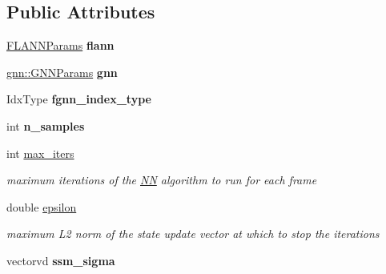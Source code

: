 \subsection*{Public Attributes}
\begin{DoxyCompactItemize}
\item 
\hypertarget{structmtf_1_1NNParams_aba503f4e6671f3c21ee9f25215bbb5e3}{\hyperlink{structmtf_1_1FLANNParams}{F\-L\-A\-N\-N\-Params} {\bfseries flann}}\label{structmtf_1_1NNParams_aba503f4e6671f3c21ee9f25215bbb5e3}

\item 
\hypertarget{structmtf_1_1NNParams_aa31237cc9d8a6d825af01c606c8c4606}{\hyperlink{structgnn_1_1GNNParams}{gnn\-::\-G\-N\-N\-Params} {\bfseries gnn}}\label{structmtf_1_1NNParams_aa31237cc9d8a6d825af01c606c8c4606}

\item 
\hypertarget{structmtf_1_1NNParams_adf7994496e9d3a8204bd6b8059605432}{Idx\-Type {\bfseries fgnn\-\_\-index\-\_\-type}}\label{structmtf_1_1NNParams_adf7994496e9d3a8204bd6b8059605432}

\item 
\hypertarget{structmtf_1_1NNParams_af3b03c0976fa1a8219391f7ddd988c42}{int {\bfseries n\-\_\-samples}}\label{structmtf_1_1NNParams_af3b03c0976fa1a8219391f7ddd988c42}

\item 
\hypertarget{structmtf_1_1NNParams_aa975a023178ef9da04c0ef89eedf745b}{int \hyperlink{structmtf_1_1NNParams_aa975a023178ef9da04c0ef89eedf745b}{max\-\_\-iters}}\label{structmtf_1_1NNParams_aa975a023178ef9da04c0ef89eedf745b}

\begin{DoxyCompactList}\small\item\em maximum iterations of the \hyperlink{classNN}{N\-N} algorithm to run for each frame \end{DoxyCompactList}\item 
\hypertarget{structmtf_1_1NNParams_a4f19f6905e007e6a727087d67bebb9eb}{double \hyperlink{structmtf_1_1NNParams_a4f19f6905e007e6a727087d67bebb9eb}{epsilon}}\label{structmtf_1_1NNParams_a4f19f6905e007e6a727087d67bebb9eb}

\begin{DoxyCompactList}\small\item\em maximum L2 norm of the state update vector at which to stop the iterations \end{DoxyCompactList}\item 
\hypertarget{structmtf_1_1NNParams_a4f1b1507776b9023172bbd86e878dbbf}{vectorvd {\bfseries ssm\-\_\-sigma}}\label{structmtf_1_1NNParams_a4f1b1507776b9023172bbd86e878dbbf}


\end{DoxyCompactItemize}
